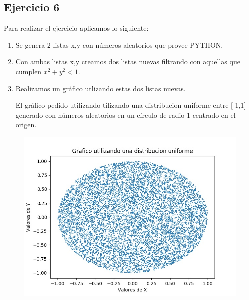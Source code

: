 \documentclass[11pt,a4paper]{article}
\begin{document}
	\subsection{Ejercicio 6}
	    Para realizar el ejercicio aplicamos lo siguiente:
	    \begin{enumerate}
	        \item Se genera 2 listas x,y con números aleatorios que provee PYTHON.
	        \item Con ambas listas x,y creamos dos listas nuevas filtrando con aquellas que cumplen $x^2+y^2<1$.
	        \item Realizamos un gráfico utlizando estas dos listas nuevas.
	        
		El gráfico pedido utilizando tilizando una distribucion uniforme entre [-1,1] generado con números aleatorios en un círculo de radio 1 centrado en el origen.
		\end{enumerate}
		\begin{figure}[H]
  			\centering
    			\includegraphics[width=14cm]{imagenes/histogramaEjer6}
		\end{figure}
\end{document}
